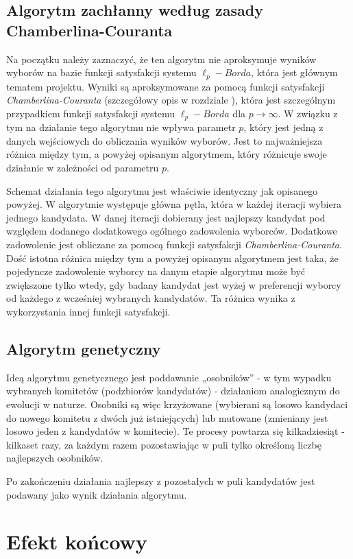 \documentclass[polish,11pt]{aghthesis}
\begin{document}
\subsection{Algorytm zachłanny według zasady Chamberlina-Couranta}
Na początku należy zaznaczyć, że ten algorytm nie aproksymuje wyników wyborów na bazie
funkcji satysfakcji systemu $\ell_p-Borda$, która jest głównym tematem projektu. Wyniki są
aproksymowane za pomocą funkcji satysfakcji \textit{Chamberlina-Couranta} (szczegółowy opis w
rozdziale \textit{}), która jest szczególnym przypadkiem funkcji satysfakcji systemu $\ell_p-Borda$ dla $p \to \infty$. W związku z tym na działanie tego algorytmu nie wpływa parametr $p$, który jest jedną z danych wejściowych do obliczania wyników wyborów. Jest to najważniejsza różnica między tym, a powyżej opisanym algorytmem, który różnicuje swoje działanie w zależności od parametru $p$.

Schemat działania tego algorytmu jest właściwie identyczny jak opisanego powyżej. W algorytmie
występuje główna pętla, która w każdej iteracji wybiera jednego kandydata. W danej iteracji
dobierany jest najlepszy kandydat pod względem dodanego dodatkowego ogólnego
zadowolenia wyborców. Dodatkowe zadowolenie jest obliczane za pomocą funkcji satysfakcji \textit{Chamberlina-Couranta}. Dość istotna różnica między tym a powyżej opisanym algorytmem jest
taka, że pojedyncze zadowolenie wyborcy na danym etapie algorytmu może być zwiększone
tylko wtedy, gdy badany kandydat jest wyżej w preferencji wyborcy od każdego z wcześniej
wybranych kandydatów. Ta różnica wynika z wykorzystania innej funkcji satysfakcji.

\subsection{Algorytm genetyczny}
Ideą algorytmu genetycznego jest poddawanie „osobników” - w tym wypadku wybranych komitetów (podzbiorów kandydatów) - działaniom analogicznym do ewolucji w naturze. Osobniki są więc krzyżowane (wybierani są losowo kandydaci do nowego komitetu z dwóch już istniejących) lub mutowane (zmieniany jest losowo jeden z kandydatów w komitecie). Te procesy powtarza się kilkadziesiąt - kilkaset razy, za każdym razem pozostawiając w puli tylko określoną liczbę najlepszych osobników.

Po zakończeniu działania najlepszy z pozostałych w puli kandydatów jest podawany jako wynik działania algorytmu.

\newpage
\section{Efekt końcowy}
\end{document}
